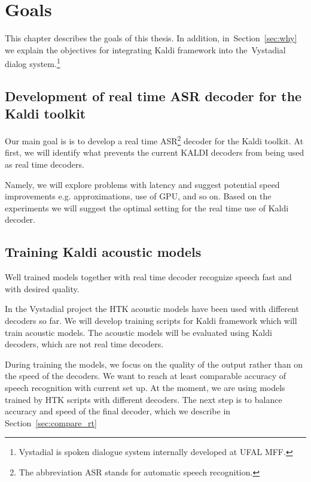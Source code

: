 \chapter{Goals}
\label{cha:goals}
This chapter describes the goals of this thesis. 
In addition, in~Section~\ref{sec:why} we explain the objectives for integrating Kaldi framework into the~Vystadial dialog system.\footnote{Vystadial is spoken dialogue system internally developed at UFAL MFF.} 

\section{Development of real time ASR decoder for the Kaldi toolkit}
\label{sec:development_of_real_time_asr_decoder_for_the_kaldi_toolkit}
Our main goal is is to develop a real time ASR\footnote{The abbreviation ASR stands for automatic speech recognition.} decoder for the Kaldi toolkit. At first, we will identify what prevents the current KALDI decoders from being used as real time decoders. 

Namely, we will explore problems with latency and suggest potential speed improvements e.g. approximations, use of GPU, and so on. Based on the experiments we will suggest the optimal setting for the real time use of Kaldi decoder.


\section{Training Kaldi acoustic models} 
\label{sec:training_kaldi_acoustic_models}
Well trained models together with real time decoder recognize speech fast and with desired quality.

In the Vystadial project the HTK acoustic models have been used with different decoders so far.
We will develop training scripts for Kaldi framework which will train acoustic models. 
The acoustic models will be evaluated using Kaldi decoders, which are not real time decoders. 

During training the models, we focus on the quality of the output rather than on the speed of the decoders.
We want to reach at least comparable accuracy of speech recognition with current set up. At the moment, we are using models trained by HTK scripts with different decoders. The next step is to balance accuracy and speed of the final decoder, which we describe in Section~\ref{sec:compare_rt}

